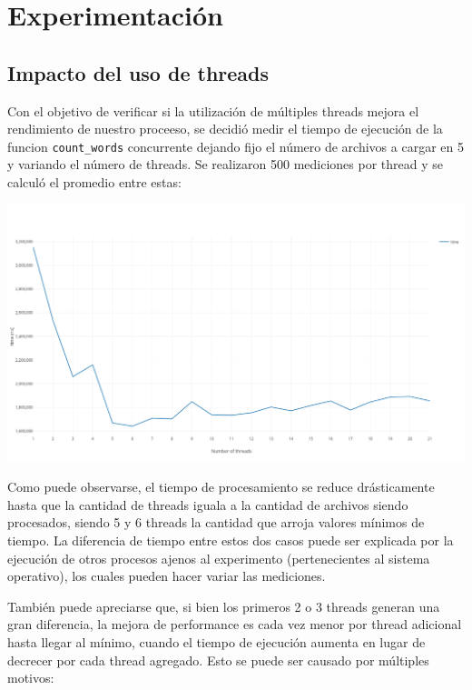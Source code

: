 \section{Experimentación}

\subsection{Impacto del uso de threads}

Con el objetivo de verificar si la utilización de múltiples threads mejora el rendimiento de nuestro proceeso, se decidió medir el tiempo de ejecución de la funcion \texttt{count\_words} concurrente dejando fijo el número de archivos a cargar en 5 y variando el número de threads.
Se realizaron 500 mediciones por thread y se calculó el promedio entre estas:

\begin{center}
	\includegraphics[scale=0.38]{imgs/count_words.png}
\end{center}

Como puede observarse, el tiempo de procesamiento se reduce drásticamente hasta que la cantidad de threads iguala a la cantidad de archivos siendo procesados, siendo 5 y 6 threads la cantidad que arroja valores mínimos de tiempo.
La diferencia de tiempo entre estos dos casos puede ser explicada por la ejecución de otros procesos ajenos al experimento (pertenecientes al sistema operativo), los cuales pueden hacer variar las mediciones.

También puede apreciarse que, si bien los primeros 2 o 3 threads generan una gran diferencia, la mejora de performance es cada vez menor por thread adicional hasta llegar al mínimo, cuando el tiempo de ejecución aumenta en lugar de decrecer por cada thread agregado. Esto se puede ser causado por múltiples motivos:

